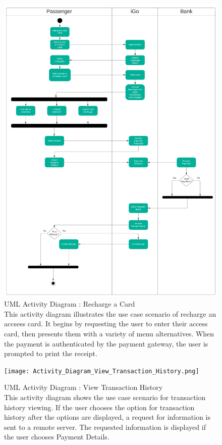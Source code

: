\documentclass[a4paper, 11pt]{report}
\begin{document}
\begin{figure}[h]
    \centering
    \includegraphics[scale=0.15]{Activity_diagram_Recharge_a_Card.png}
    \caption{UML Activity Diagram : Recharge a Card \\This activity diagram illustrates the use case scenario of recharge an accsess card. It begins by requesting the user to enter their access card, then presents them with a variety of menu alternatives. When the payment is authenticated by the payment gateway, the user is prompted to print the receipt.\\
    }
    \label{fig:Activity Diagram Recharge a card}
\end{figure} 
\begin{figure}[h]
    \centering
    \texttt{[image: Activity\_Diagram\_View\_Transaction\_History.png]}
    \caption{UML Activity Diagram : View Transaction History\\ 
    This activity diagram shows the use case scenario for transaction history viewing. If the user chooses the option for transaction history after the options are displayed, a request for information is sent to a remote server. The requested information is displayed if the user chooses Payment Details.}
    \label{fig:Activity Diagram View Transaction History}
\end{figure}
 
\end{document}
